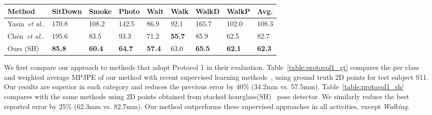 \documentclass[runningheads]{llncs}
\makeatletter
\DeclareRobustCommand\onedot{\futurelet\@let@token\@onedot}
\def\@onedot{\ifx\@let@token.\else.\null\fi\xspace}
\def\etal{\emph{et al}\onedot}
\makeatother
\begin{document}
\begin{table*}[t]
\begin{tabularx}{\textwidth}{ l *{8}{Y} }
		\bottomrule
		\toprule
		Method & SitDown & Smoke & Photo & Wait & Walk & WalkD & WalkP & Avg.\\
		\midrule
		Yasin~\etal \cite{Yasin_2016_CVPR}& {170.8} & 108.2 & 142.5 & 86.9 & 92.1 & 165.7 & 102.0 & 108.3 \\
		Chen~\etal \cite{ChenDeva2017} & 195.6 & 83.5 &93.3 &71.2 &\textbf{55.7} &85.9 &62.5& 82.7 \\		
		Ours (SH) & \textbf{85.8} &	\textbf{60.4} & \textbf{64.7} & \textbf{57.4} & {63.0} & \textbf{65.5} &	\textbf{62.1} & \textbf{62.3}\\
		\bottomrule
	\end{tabularx}
\end{table*}

We first compare our approach to methods that adopt Protocol 1 in their evaluation. Table~\ref{table:protocol1_gt} compares the per class and weighted average MPJPE of our method with recent supervised learning methods~\cite{ChenDeva2017,Yasin_2016_CVPR}, using ground truth 2D points for test subject S11. Our results are superior in each category and reduces the previous error by $40\%$ (34.2mm vs. 57.5mm). Table~\ref{table:protocol1_sh} compares with the same methods using 2D points obtained from stacked hourglass(SH)~\cite{stacked-hourglass} pose detector. We similarly reduce the best reported error by $25\%$ (62.3mm vs. 82.7mm). Our method outperforms these supervised approaches in all activities, except \textit{Walking}.
\end{document}
